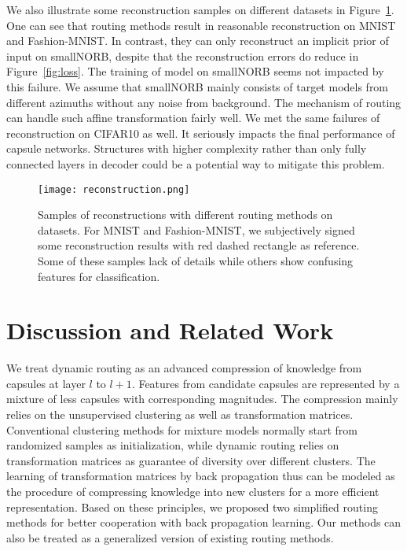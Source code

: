 \documentclass[runningheads]{llncs}
\begin{document}
We also illustrate some reconstruction samples on different datasets in Figure~\ref{fig:recon}. One can see that routing methods result in reasonable reconstruction on MNIST and Fashion-MNIST. In contrast, they can only reconstruct an implicit prior of input on smallNORB, despite that the reconstruction errors do reduce in Figure~\ref{fig:loss}. The training of model on smallNORB seems not impacted by this failure. We assume that smallNORB mainly consists of target models from different azimuths without any noise from background. The mechanism of routing can handle such affine transformation fairly well. We met the same failures of reconstruction on CIFAR10 as well. It seriously impacts the final performance of capsule networks. Structures with higher complexity rather than only fully connected layers in decoder could be a potential way to mitigate this problem.
\begin{figure}
\centering
\texttt{[image: reconstruction.png]}
\caption{Samples of reconstructions with different routing methods on datasets. For MNIST and Fashion-MNIST, we subjectively signed some reconstruction results with red dashed rectangle as reference. Some of these samples lack of details while others show confusing features for classification.}
\label{fig:recon}
\end{figure}



\section{Discussion and Related Work}

We treat dynamic routing as an advanced compression of knowledge from capsules at layer $l$ to $l+1$. Features from candidate capsules are represented by a mixture of less capsules with corresponding magnitudes. The compression mainly relies on the unsupervised clustering as well as transformation matrices. Conventional clustering methods for mixture models normally start from randomized samples as initialization, while dynamic routing relies on transformation matrices as guarantee of diversity over different clusters. The learning of transformation matrices by back propagation thus can be modeled as the procedure of compressing knowledge into new clusters for a more efficient representation. Based on these principles, we proposed two simplified routing methods for better cooperation with back propagation learning. Our methods can also be treated as a generalized version of existing routing methods.
\end{document}
